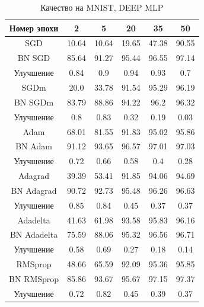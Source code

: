\documentclass[12pt]{article}
\begin{document}
\begin{table}[h!]
\centering
\begin{tabular}{|c|c|c|c|c|c|}\hline
\textbf{Номер эпохи} & \textbf{2} & \textbf{5} & \textbf{20} & \textbf{35} & \textbf{50} \\\hline\hline
SGD & 10.64 & 10.64 & 19.65 & 47.38 & 90.55 \\\hline
BN SGD & 85.64 & 91.27 & 95.44 & 96.55 & 97.14 \\\hline
Улучшение & 0.84 & 0.9 & 0.94 & 0.93 & 0.7 \\\hline\hline
SGDm & 20.0 & 33.78 & 91.54 & 95.29 & 96.19 \\\hline
BN SGDm & 83.79 & 88.86 & 94.22 & 96.2 & 96.32 \\\hline
Улучшение & 0.8 & 0.83 & 0.32 & 0.19 & 0.03 \\\hline\hline
Adam & 68.01 & 81.55 & 91.83 & 95.02 & 95.86 \\\hline
BN Adam & 91.12 & 93.65 & 96.57 & 97.01 & 97.03 \\\hline
Улучшение & 0.72 & 0.66 & 0.58 & 0.4 & 0.28 \\\hline\hline
Adagrad & 39.39 & 53.41 & 91.85 & 94.06 & 94.69 \\\hline
BN Adagrad & 90.72 & 92.73 & 95.48 & 96.26 & 96.63 \\\hline
Улучшение & 0.85 & 0.84 & 0.45 & 0.37 & 0.37 \\\hline\hline
Adadelta & 41.63 & 61.98 & 93.58 & 95.83 & 96.16 \\\hline
BN Adadelta & 75.59 & 88.06 & 95.32 & 96.56 & 96.71 \\\hline
Улучшение & 0.58 & 0.69 & 0.27 & 0.18 & 0.14 \\\hline\hline
RMSprop & 48.66 & 65.59 & 92.09 & 95.36 & 95.85 \\\hline
BN RMSprop & 85.86 & 93.67 & 95.67 & 97.15 & 97.37 \\\hline
Улучшение & 0.72 & 0.82 & 0.45 & 0.39 & 0.37 \\\hline
\end{tabular}
\caption{Качество на MNIST, DEEP MLP}
\end{table}
\end{document}
